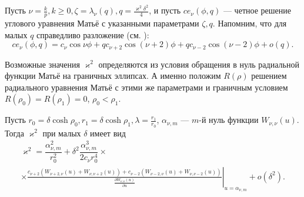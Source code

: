Пусть $\nu = \frac{k}{p}, k \geq 0, \zeta = \lambda_\nu(q), q=\frac{\varkappa^2 \delta^2}{4}$, и пусть $ce_\nu(\phi, q)$ --- четное решение углового уравнения Матьё с указанными параметрами $\zeta, q$. Напомним, что для малых $q$ справедливо разложение (см. \cite[\S~2.2, с.~122---124]{wref12}):
$$ce_\nu(\phi, q) = c_\nu \cos{\nu \phi} + q c_{\nu+2} \cos{(\nu+2) \phi} +q c_{\nu-2} \cos{(\nu-2) \phi} + o(q).$$ 

Возможные значения $\varkappa^2$ определяются из условия обращения в нуль радиальной функции Матьё на граничных эллипсах. А именно положим 
$R(\rho)$ решением радиального уравнения Матьё с этими же параметрами и граничным условием $R(\rho_0)=R(\rho_1)=0$, $\rho_0 < \rho_1$. 
\begin{lemma}
Пусть $r_0 = \delta\cosh{\rho_0}, r_1 = \delta\cosh{\rho_1}, \lambda = \frac{r_1}{r_0}$, $\alpha_{\nu, m}$ --- $m$-й нуль функции $W_{\nu, \nu}(u)$. Тогда $\varkappa^2$ при малых $\delta$ имеет вид
\begin{multline*}
\varkappa^2 = \dfrac{\alpha_{\nu, m}^2}{r_0^2} + \delta^2 \dfrac{\alpha_{\nu, m}^3}{2 c_\nu r_0^4} \times \\ \times \left. \frac{
c_{\nu+2} \left( W_{\nu+2, \nu}(u) + W_{\nu, \nu+2}(u) \right) + 
c_{\nu-2} \left( W_{\nu-2, \nu}(u) + W_{\nu, \nu-2}(u) \right)
}{ \frac{\partial W_{\nu,\nu}(u)}{\partial u} }\right|_{u=\alpha_{\nu, m}} + o(\delta^2).
\end{multline*}
\label{th:ringLemma1}
\end{lemma}

